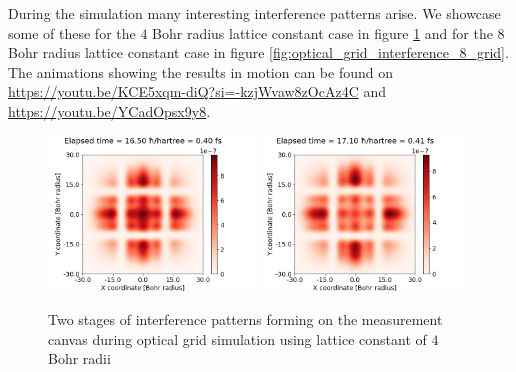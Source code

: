 During the simulation many interesting interference patterns arise.
We showcase some of these for the $4$ Bohr radius lattice constant case in figure \ref{fig:optical_grid_interference} and for the $8$ Bohr radius lattice constant case in figure \ref{fig:optical_grid_interference_8_grid}.
The animations showing the results in motion can be found on \url{https://youtu.be/KCE5xqm-diQ?si=-kzjWvaw8zOcAz4C} and \url{https://youtu.be/YCadOpsx9y8}.
\begin{figure}
	\begin{center}
		\includegraphics[width=0.49\textwidth]{figures/optical_grid_interference_01.png}
		\includegraphics[width=0.49\textwidth]{figures/optical_grid_interference_02.png}
		\caption{Two stages of interference patterns forming on the measurement canvas during optical grid simulation using lattice constant of $4$ Bohr radii}
		\label{fig:optical_grid_interference}
	\end{center}	
\end{figure}
